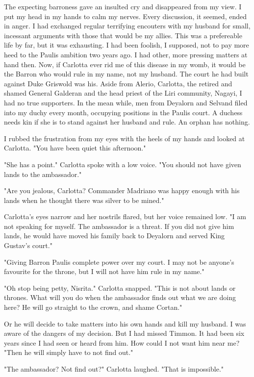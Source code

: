 \documentclass{article}
\begin{document}
The expecting barroness gave an insulted cry and disappeared from my view. I put my head in my hands to calm my nerves. Every discussion, it seemed, ended in anger. I had exchanged regular terrifying encouters with my husband for small, incessant arguments with those that would be my allies. This was a prefereable life by far, but it was exhausting. I had been foolish, I supposed, not to pay more heed to the Paulis ambition two years ago. I had other, more pressing matters at hand then. Now, if Carlotta ever rid me of this disease in my womb, it would be the Barron who would rule in my name, not my husband. The court he had built against Duke Griswold was his. Aside from Alerio, Carlotta, the retired and shamed General Galderan and the head priest of the Liri community, Nagayi, I had no true supporters. In the mean while, men from Deyalorn and Selvand filed into my duchy every month, occupying positions in the Paulis court. A duchess needs kin if she is to stand against her husband and rule. An orphan has nothing. 

I rubbed the frustration from my eyes with the heels of my hands and looked at Carlotta. "You have been quiet this afternoon."

"She has a point." Carlotta spoke with a low voice. "You should not have given lands to the ambassador."

"Are you jealous, Carlotta? Commander Madriano was happy enough with his lands when he thought there was silver to be mined."

Carlotta's eyes narrow and her nostrils flared, but her voice remained low. "I am not speaking for myself. The ambassador is a threat. If you did not give him lands, he would have moved his family back to Deyalorn and served King Gustav's court."

"Giving Barron Paulis complete power over my court. I may not be anyone's favourite for the throne, but I will not have him rule in my name."

"Oh stop being petty, Nisrita." Carlotta snapped. "This is not about lands or thrones. What will you do when the ambassador finds out what we are doing here? He will go straight to the crown, and shame Cortan."

Or he will decide to take matters into his own hands and kill my husband. I was aware of the dangers of my decision. But I had missed Timmon. It had been six years since I had seen or heard from him. How could I not want him near me? "Then he will simply have to not find out."

"The ambassador? Not find out?" Carlotta laughed. "That is impossible."
\end{document}
